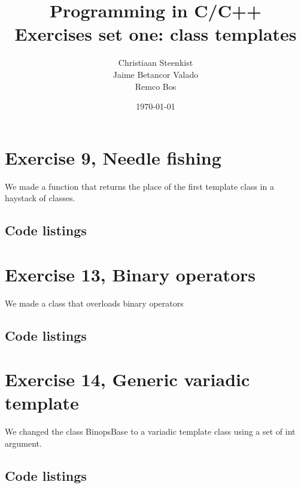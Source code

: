 \documentclass[11pt]{article}
\begin{document}
\title{Programming in C/C++ \\
       Exercises set one: class templates
}
\date{\today}
\author{Christiaan Steenkist \\
Jaime Betancor Valado \\
Remco Bos \\
}

\maketitle
\section*{Exercise 9, Needle fishing}
We made a function that returns the place of the first template class in a haystack of classes.

\subsection*{Code listings}



\section*{Exercise 13, Binary operators}
We made a class that overloads binary operators

\subsection*{Code listings}











\section*{Exercise 14, Generic variadic template }
We changed the class BinopsBase to a variadic template class using a set of int argument.

\subsection*{Code listings}






\end{document}
